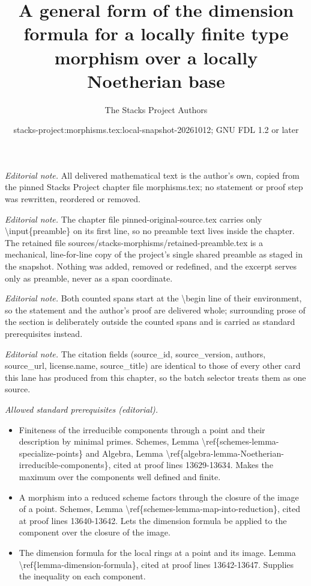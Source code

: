 \documentclass[10pt,a4paper]{amsart}
\title{A general form of the dimension formula for a locally finite type morphism over a locally Noetherian base}
\author{The Stacks Project Authors}
\date{stacks-project:morphisms.tex:local-snapshot-20261012; GNU FDL 1.2 or later}
\theoremstyle{plain}
\theoremstyle{definition}
\theoremstyle{remark}
\numberwithin{equation}{subsection}
\begin{document}
\maketitle
\setcounter{subsection}{1}
\noindent\textit{Editorial note.} All delivered mathematical text is the author's own, copied from the pinned Stacks Project chapter file morphisms.tex; no statement or proof step was rewritten, reordered or removed.\par\medskip
\noindent\textit{Editorial note.} The chapter file pinned-original-source.tex carries only \textbackslash{}input\{preamble\} on its first line, so no preamble text lives inside the chapter. The retained file sources/stacks-morphisms/retained-preamble.tex is a mechanical, line-for-line copy of the project's single shared preamble as staged in the snapshot. Nothing was added, removed or redefined, and the excerpt serves only as preamble, never as a span coordinate.\par\medskip
\noindent\textit{Editorial note.} Both counted spans start at the \textbackslash{}begin line of their environment, so the statement and the author's proof are delivered whole; surrounding prose of the section is deliberately outside the counted spans and is carried as standard prerequisites instead.\par\medskip
\noindent\textit{Editorial note.} The citation fields (source\_id, source\_version, authors, source\_url, license.name, source\_title) are identical to those of every other card this lane has produced from this chapter, so the batch selector treats them as one source.\par\medskip
\noindent\textit{Allowed standard prerequisites (editorial).}\begin{itemize}
\item Finiteness of the irreducible components through a point and their description by minimal primes. Schemes, Lemma \textbackslash{}ref\{schemes-lemma-specialize-points\} and Algebra, Lemma \textbackslash{}ref\{algebra-lemma-Noetherian-irreducible-components\}, cited at proof lines 13629-13634. Makes the maximum over the components well defined and finite.
\item A morphism into a reduced scheme factors through the closure of the image of a point. Schemes, Lemma \textbackslash{}ref\{schemes-lemma-map-into-reduction\}, cited at proof lines 13640-13642. Lets the dimension formula be applied to the component over the closure of the image.
\item The dimension formula for the local rings at a point and its image. Lemma \textbackslash{}ref\{lemma-dimension-formula\}, cited at proof lines 13642-13647. Supplies the inequality on each component.
\end{itemize}\medskip
\end{document}
